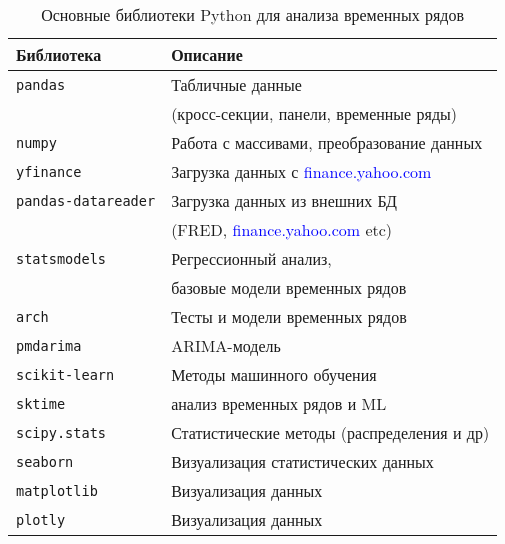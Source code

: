 \documentclass[12pt]{article}
\theoremstyle{remark}
\begin{document}
\begin{table}[h]%
	\begin{tabular}{l|l}
		Библиотека & Описание \\ \hline
		\texttt{pandas} & Табличные данные \\
		& (кросс-секции, панели, временные ряды) \\
		\texttt{numpy} & Работа с массивами, преобразование данных \\
		\texttt{yfinance} & Загрузка данных с \textcolor{blue}{finance.yahoo.com}\\
		\texttt{pandas-datareader} & Загрузка данных из внешних БД \\
		&  (FRED, \textcolor{blue}{finance.yahoo.com} etc) \\
		\texttt{statsmodels} & Регрессионный анализ, \\
		& базовые модели временных рядов \\
		\texttt{arch} & Тесты и модели временных рядов \\
		\texttt{pmdarima} & ARIMA-модель \\
		\texttt{scikit-learn} & Методы машинного обучения \\
		\texttt{sktime} & анализ временных рядов и ML\\ 
		\texttt{scipy.stats} & Статистические методы (распределения и др) \\
		\texttt{seaborn} & Визуализация статистических данных \\
		\texttt{matplotlib} & Визуализация данных \\
		\texttt{plotly} & Визуализация данных \\
		\hline
	\end{tabular}
	\caption{Основные библиотеки Python для анализа временных рядов}
\end{table}
\end{document}
